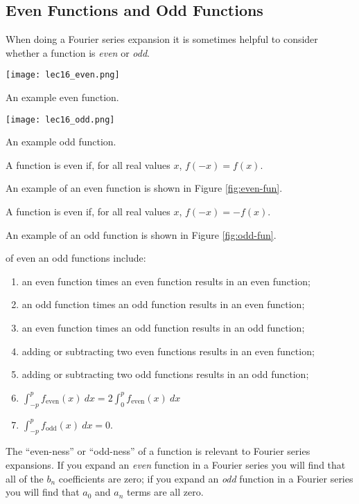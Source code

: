 \subsection{Even Functions and Odd Functions}  
When doing a Fourier series expansion it is sometimes helpful to consider whether a function is \emph{even} or \emph{odd}.  
\begin{marginfigure}
\texttt{[image: lec16\_even.png]}
\caption{An example even function.}
\label{fig:even-fun}
\end{marginfigure}
\begin{marginfigure}
\texttt{[image: lec16\_odd.png]}
\caption{An example odd function.}
\label{fig:odd-fun}
\end{marginfigure}
\begin{definition}
A function is even if, for all real values $x$, $f(-x) = f(x)$.  
\end{definition}
An example of an even function is shown in Figure \ref{fig:even-fun}.
\begin{definition}
A function is even if, for all real values $x$, $f(-x) = -f(x)$.
\end{definition}
An example of an odd function is shown in Figure \ref{fig:odd-fun}.

 of even an odd functions include:
\begin{enumerate}
\item an even function times an even function results in an even function;
\item an odd function times an odd function results in an even function;
\item an even function times an odd function results in an odd function;
\item adding or subtracting two even functions results in an even function;
\item adding or subtracting two odd functions results in an odd function;
\item $\int_{-p}^{p} f_{\text{even}}(x) \ dx = 2\int_{0}^{p} f_{\text{even}}(x) \ dx$
\item $\int_{-p}^{p} f_{\text{odd}}(x) \ dx = 0$.
\end{enumerate}

The ``even-ness'' or ``odd-ness'' of a function is relevant to Fourier series expansions.  If you expand an \emph{even} function in a Fourier series you will find that all of the $b_n$ coefficients are zero;  if you expand an \emph{odd} function in a Fourier series you will find that $a_0$ and $a_n$ terms are all zero.

